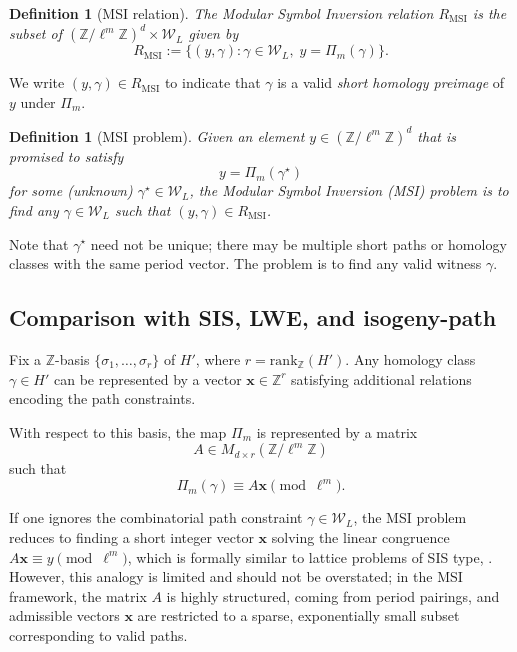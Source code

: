 \documentclass[10pt]{amsart}
\theoremstyle{theostyle}
\newtheorem{definition}[theorem]{Definition}
\newcommand{\ZZ}{\mathbb{Z}}
\newcommand{\rank}{\mathrm{rank}}
\begin{document}


\begin{definition}[MSI relation]
	The \emph{Modular Symbol Inversion relation} $R_{\mathrm{MSI}}$ is the subset
	of $(\ZZ/\ell^m\ZZ)^d\times\mathcal W_L$ given by
	\[
	R_{\mathrm{MSI}} := \{(y,\gamma) : \gamma\in\mathcal W_L,\; y=\Pi_m(\gamma)\}.
	\]
\end{definition}

We write $(y,\gamma)\in R_{\mathrm{MSI}}$ to indicate that $\gamma$ is a valid
\emph{short homology preimage} of $y$ under $\Pi_m$.

\begin{definition}[MSI problem]
	Given an element $y\in (\ZZ/\ell^m\ZZ)^d$ that is promised to satisfy
	\[
	y = \Pi_m(\gamma^\star)
	\]
	for some (unknown) $\gamma^\star \in \mathcal W_L$, the
	\emph{Modular Symbol Inversion (MSI) problem} is to find \emph{any}
	$\gamma\in\mathcal W_L$ such that $(y,\gamma)\in R_{\mathrm{MSI}}$.
\end{definition}

Note that $\gamma^\star$ need not be unique; there may be multiple short
paths or homology classes with the same period vector. The problem is to find
any valid witness $\gamma$.

\subsection{Comparison with SIS, LWE, and isogeny-path}

Fix a $\ZZ$-basis $\{\sigma_1,\dots,\sigma_r\}$ of $H'$, where
$r=\rank_\ZZ(H')$. Any homology class $\gamma\in H'$ can be represented by a
vector $\mathbf x\in\ZZ^r$ satisfying additional relations encoding the path
constraints.

With respect to this basis, the map $\Pi_m$ is represented by a matrix
\[
A \in M_{d\times r}(\ZZ/\ell^m\ZZ)
\]
such that
\[
\Pi_m(\gamma) \equiv A\mathbf x \pmod{\ell^m}.
\]

If one ignores the combinatorial path constraint $\gamma\in\mathcal W_L$, the
MSI problem reduces to finding a short integer vector $\mathbf x$ solving the
linear congruence $A\mathbf x \equiv y \pmod{\ell^m}$,
which is formally similar to lattice problems of SIS type, \cite{Ajtai:SIS,GPV:SIS}. However, this
analogy is limited and should not be overstated;
%
in the MSI framework, the matrix $A$ is highly structured, coming from period
	pairings, %
	and admissible vectors $\mathbf x$ are
	restricted to a sparse, exponentially small subset corresponding to valid
	paths.
\end{document}
